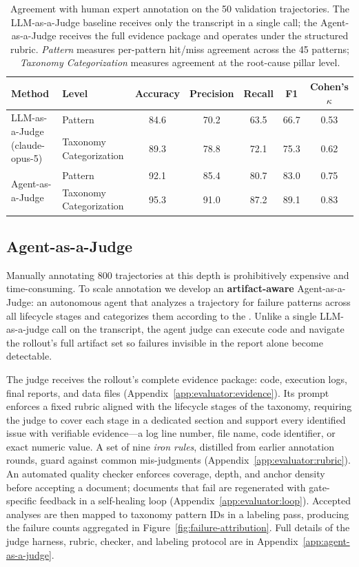 \begin{table}[t]
\centering
\small
\caption{Agreement with human expert annotation on the 50 validation
trajectories. The LLM-as-a-Judge baseline receives only the transcript in
a single call; the Agent-as-a-Judge receives the full evidence package and
operates under the structured rubric. \emph{Pattern} measures per-pattern
hit/miss agreement across the 45 \taxonomy patterns; \emph{Taxonomy
Categorization} measures agreement at the root-cause pillar level.}
\label{tab:judge-performance}
\begin{tabular}{llccccc}
\toprule
Method & Level & Accuracy & Precision & Recall & F1 & Cohen's $\kappa$ \\
\midrule
\multirow{2}{*}{LLM-as-a-Judge (claude-opus-5)}
 & Pattern       & 84.6 & 70.2 & 63.5 & 66.7 & 0.53 \\
 & Taxonomy Categorization & 89.3 & 78.8 & 72.1 & 75.3 & 0.62 \\
\midrule
\multirow{2}{*}{Agent-as-a-Judge}
 & Pattern       & 92.1 & 85.4 & 80.7 & 83.0 & 0.75 \\
 & Taxonomy Categorization & 95.3 & 91.0 & 87.2 & 89.1 & 0.83 \\
\bottomrule
\end{tabular}
\end{table}

\subsection{Agent-as-a-Judge}
\label{sec:judge:agent}

Manually annotating 800 trajectories at this depth is prohibitively
expensive and time-consuming. To scale annotation we develop an
\textbf{artifact-aware} Agent-as-a-Judge: an autonomous agent that
analyzes a trajectory for failure patterns across all lifecycle stages and
categorizes them according to the \taxonomy. Unlike a single LLM-as-a-judge
call on the transcript, the agent judge can execute code and navigate the
rollout's full artifact set so
failures invisible in the report alone become detectable.
 
The judge receives the rollout's complete evidence package:  code, execution logs, final reports, and data files (Appendix~\ref{app:evaluator:evidence}). Its prompt
enforces a fixed rubric aligned with the lifecycle stages of the taxonomy,
requiring the judge to cover each stage in a dedicated section and support
every identified issue with verifiable evidence---a log line number, file
name, code identifier, or exact numeric value. A set of nine \emph{iron
rules}, distilled from earlier annotation rounds, guard against common
mis-judgments (Appendix~\ref{app:evaluator:rubric}). An automated quality
checker enforces coverage, depth, and anchor density before accepting a
document; documents that fail are regenerated with gate-specific feedback
in a self-healing loop (Appendix~\ref{app:evaluator:loop}). Accepted
analyses are then mapped to taxonomy pattern IDs in a labeling pass,
producing the failure counts aggregated in
Figure~\ref{fig:failure-attribution}. Full details of the judge harness,
rubric, checker, and labeling protocol are in
Appendix~\ref{app:agent-as-a-judge}.


